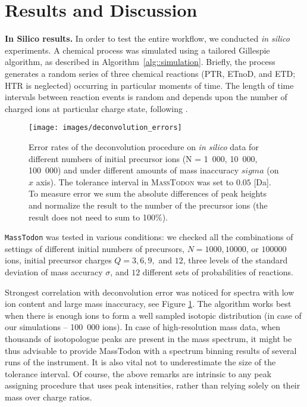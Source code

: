 \documentclass[journal=ancham, manuscript=article, layout=twocolumn]{achemso}
\begin{document}
\section{Results and Discussion}

\noindent\textbf{In Silico results.} In order to test the entire workflow, we conducted \textit{in silico} experiments. 
A chemical process was simulated using a tailored Gillespie algorithm\cite{gillespie1977exact}, as described in Algorithm~\ref{alg::simulation}.
Briefly, the process generates a random series of three chemical reactions (PTR, ETnoD, and ETD; HTR is neglected) occurring in particular moments of time. The length of time intervals between reaction events is random and depends upon the number of charged ions at particular charge state, following \citet{McLuckey1999-su}. 


\begin{figure}[t]
	\centering
	\texttt{[image: images/deconvolution\_errors]}
	\caption{Error rates of the deconvolution procedure on \textit{in silico} data for different numbers of initial precursor ions (N = 1~000, 10~000, 100~000) and under different amounts of mass inaccuracy $sigma$ (on $x$ axis). The tolerance interval in \textsc{MassTodon} was set to $0.05$ [Da]. To measure error we sum the absolute differences of peak heights and normalize the result to the number of the precursor ions  (the result does not need to sum to 100\%).
	}
    \label{fig::in silico errors}
\end{figure}


{\tt MassTodon} was tested in various conditions: we checked all the combinations of settings of different initial numbers of precursors, $N = 1000, 10000$, or $100000$ ions, initial precursor charges $Q = 3, 6, 9,$ and $12$, three levels of the standard deviation of mass accuracy $\sigma$, and $12$ different sets of probabilities of reactions.

Strongest correlation with deconvolution error was noticed for spectra with low ion content and large mass inaccuracy, see Figure \ref{fig::in silico errors}.
The algorithm works best when there is enough ions to form a well sampled isotopic distribution (in case of our simulations -- 100~000 ions). 
In case of high-resolution mass data, when thousands of isotopologue peaks are present in the mass spectrum, it might be thus advisable to provide MassTodon with a spectrum binning results of several runs of the instrument. 
It is also vital not to underestimate the size of the tolerance interval. 
Of course, the above remarks are intrinsic to any peak assigning procedure that uses peak intensities, rather than relying solely on their mass over charge ratios. 
\end{document}
